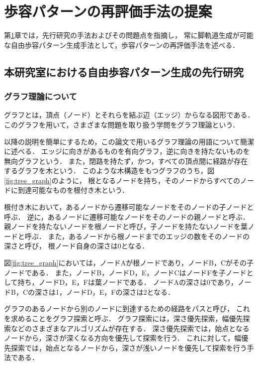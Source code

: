 ﻿%


\chapter{歩容パターンの再評価手法の提案}\label{chapter:歩容パターンの再評価手法の提案}
第\ref{chapter:歩容パターンの再評価手法の提案}章では，先行研究の手法およびその問題点を指摘し，
常に脚軌道生成が可能な自由歩容パターン生成手法として，歩容パターンの再評価手法を述べる．

\section{本研究室における自由歩容パターン生成の先行研究}
\subsection{グラフ理論について}
グラフとは，頂点（ノード）とそれらを結ぶ辺（エッジ）からなる図形である．
このグラフを用いて，さまざまな問題を取り扱う学問をグラフ理論という．

以降の説明を簡単にするため，この論文で用いるグラフ理論の用語について簡潔に述べる．
エッジに向きがあるものを有向グラフ，逆に向きを持たないものを無向グラフという．
また，閉路を持たず，かつ，すべての頂点間に経路が存在するグラフを木という．
このような木構造をもつグラフのうち，図\ref*{fig:tree_graph}のように，
根となるノードを持ち，そのノードからすべてのノードに到達可能なものを根付き木という．

根付き木において，あるノードから遷移可能なノードをそのノードの子ノードと呼ぶ．
逆に，あるノードに遷移可能なノードをそのノードの親ノードと呼ぶ．
親ノードを持たないノードを根ノードと呼び，子ノードを持たないノードを葉ノードと呼ぶ．
また，あるノードから根ノードまでのエッジの数をそのノードの深さと呼び，
根ノード自身の深さは0となる．

図\ref*{fig:tree_graph}においては，ノードAが根ノードであり，ノードB，Cがその子ノードである．
また，ノードB，ノードD，E，ノードCはノードFを子ノードとして持ち，ノードD，E，Fは葉ノードである．
ノードAの深さは0であり，ノードB，Cの深さは1，ノードD，E，Fの深さは2となる．

グラフのあるノードから別のノードに到達するための経路をパスと呼び，
これを求めることをグラフ探索と呼ぶ．
グラフ探索には，深さ優先探索，幅優先探索などのさまざまなアルゴリズムが存在する．
深さ優先探索では，始点となるノードから，深さが深くなる方向を優先して探索を行う．
これに対して，幅優先探索では，始点となるノードから，深さが浅いノードを優先して探索を行う手法である．

